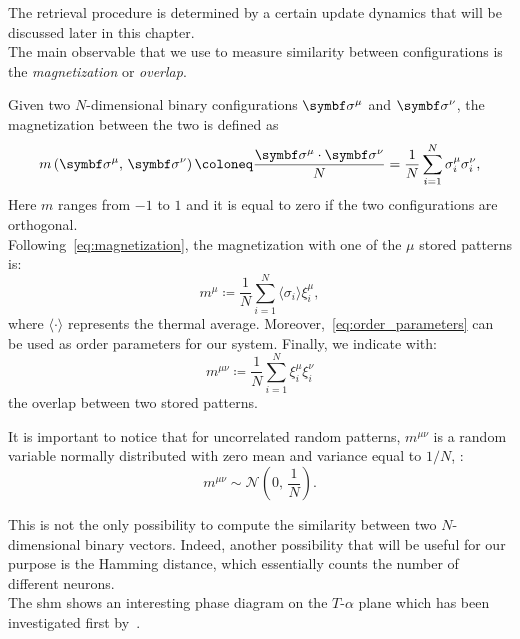 \documentclass[\rootdir/main.tex]{subfiles}
\begin{document}
The retrieval procedure is determined by a certain update dynamics that will be discussed later in this chapter.\\
The main observable that we use to measure similarity between configurations is the \emph{magnetization} or \emph{overlap}.
\begin{definition}[Magnetization]
Given two $N$-dimensional binary configurations $\bsigma^\mu$ and $\bsigma^\nu$, the magnetization between the two is defined as
\begin{equation}\label{eq:magnetization}
    m\left(\bsigma^\mu, \, \bsigma^\nu \right) \coloneq \frac{\bsigma^\mu \cdot \bsigma^\nu}{N} = \frac{1}{N} \sum_{i = 1}^{N} \sigma_i^\mu \sigma_i^\nu,
\end{equation}
Here $m$ ranges from $-1$ to $1$ and it is equal to zero if the two configurations are orthogonal.\\
Following~\cref{eq:magnetization}, the magnetization with one of the $\mu$ stored patterns is:
\begin{equation}\label{eq:order_parameters}
    m^\mu \coloneq \frac{1}{N}\sum_{i = 1}^N \langle \sigma_i \rangle \xi_i^\mu,
\end{equation}
where $\langle \cdot \rangle$ represents the thermal average. Moreover,~\cref{eq:order_parameters} can be used as order parameters for our system.
Finally, we indicate with:
\begin{equation}
    m^{\mu \nu} \coloneq \frac{1}{N} \sum_{i = 1}^{N} \xi_{i}^{\mu} \xi_{i}^{\nu}
\end{equation}
the overlap between two stored patterns.
\end{definition}
\begin{remark}
It is important to notice that for uncorrelated random patterns, $m^{\mu \nu}$ is a random variable normally distributed with zero mean and variance equal to $1/N$, \ie:
\begin{equation}
    m^{\mu \nu} \sim \mathcal{N} \left( 0, \, \frac{1}{N} \right).
\end{equation}
\end{remark}
This is not the only possibility to compute the similarity between two $N$-dimensional binary vectors. Indeed, another possibility that will be useful for our purpose is the Hamming distance, which essentially counts the number of different neurons.\\
The \acrlong{shm} shows an interesting phase diagram on the $T$-$\alpha$ plane which has been investigated first by~\textcite{amit_phase}.\\
\end{document}
